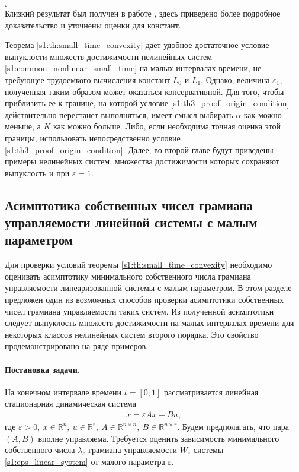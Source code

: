 \documentclass[../main.tex]{subfiles}
\begin{document}
 \hfill$\square$\\[1ex]%
 
 Близкий результат был получен в работе \cite{GusevMotor}, здесь приведено более подробное доказательство и уточнены оценки для констант.
 
 \begin{zam}
 	Теорема \ref{s1:th:small_time_convexity} дает удобное достаточное условие выпуклости множеств достижимости нелинейных систем \eqref{s1:common_nonlinear_small_time} на малых интервалах времени, не требующее трудоемкого вычисления констант $L_0$ и $L_1$.
 	Однако, величина $\varepsilon_1$, полученная таким образом может оказаться консервативной. 
 	Для того, чтобы приблизить ее к границе, на которой условие \eqref{s1:th3_proof_origin_condition} действительно перестанет выполняться, имеет смысл выбирать $\alpha$ как можно меньше, а $K$ как можно больше. 
 	Либо, если необходима точная оценка этой границы, использовать непосредственно условие \eqref{s1:th3_proof_origin_condition}.
 	Далее, во второй главе будут приведены примеры нелинейных систем, множества достижимости которых сохраняют выпуклость и при $ \varepsilon = 1$.
 \end{zam}
 \subsection{Асимптотика собственных чисел грамиана управляемости линейной системы с малым параметром} 
Для проверки условий теоремы \ref{s1:th:small_time_convexity} необходимо оценивать асимптотику минимального собственного числа грамиана управляемости линеаризованной системы с малым параметром.
В этом разделе предложен один из возможных способов проверки асимптотики собственных чисел грамиана управляемости таких систем.
Из полученной асимптотики следует выпуклость множеств достижимости на малых интервалах времени для некоторых классов нелинейных систем второго порядка.
Это свойство продемонстрировано на ряде примеров.

\paragraph{Постановка задачи.} На конечном интервале времени $ t = [0;1] $ рассматривается линейная стационарная динамическая система 
\begin{gather}\label{s1:eps_linear_system}
 \dot{x} = \varepsilon A x + Bu, 
\end{gather}
где $ \varepsilon > 0, \ x \in \mathbb{R}^n, \ u \in \mathbb{R}^r, \ A \in \mathbb{R}^{n\times n}, \ B \in \mathbb{R}^{n\times r} $.
Будем предполагать, что пара $ \left( A, B\right) $ вполне управляема.
Требуется оценить зависимость минимального собственного числа $ \lambda_{\varepsilon} $ грамиана управляемости $ W_{\varepsilon} $ системы \eqref{s1:eps_linear_system} от малого параметра $ \varepsilon $.
\end{document}
